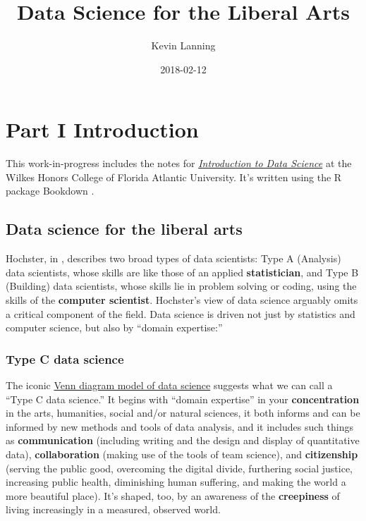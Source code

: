 \documentclass[]{book}
\title{Data Science for the Liberal Arts}
\author{Kevin Lanning}
\date{2018-02-12}
\theoremstyle{definition}
\theoremstyle{definition}
\theoremstyle{definition}
\theoremstyle{remark}
\begin{document}
\maketitle

{
\setcounter{tocdepth}{1}
\tableofcontents
}
\part{Part I Introduction}\label{part-part-i-introduction}

This work-in-progress includes the notes for
\href{https://kevinlanning.github.io/DataSciSpring2018/}{\emph{\emph{Introduction
to Data Science}}} at the Wilkes Honors College of Florida Atlantic
University. It's written using the R package Bookdown
\citep{R-bookdown}.

\chapter{Data science for the liberal
arts}\label{data-science-for-the-liberal-arts}

Hochster, in \citet{hicks2017guide}, describes two broad types of data
scientists: Type A (Analysis) data scientists, whose skills are like
those of an applied \textbf{statistician}, and Type B (Building) data
scientists, whose skills lie in problem solving or coding, using the
skills of the \textbf{computer scientist}. Hochster's view of data
science arguably omits a critical component of the field. Data science
is driven not just by statistics and computer science, but also by
``domain expertise:''

\section{Type C data science}\label{type-c-data-science}

The iconic
\href{https://www.google.com/search?q=venn+diagram+model+of+data+science\&newwindow=1\&safe=active\&rlz=1C1CHBF_enUS762US763\&tbm=isch\&tbo=u\&source=univ\&sa=X\&ved=0ahUKEwiM_abBtY7XAhXDQCYKHdgyB58QsAQIOg\&biw=1378}{Venn
diagram model of data science} suggests what we can call a ``Type C data
science.'' It begins with ``domain expertise'' in your
\textbf{concentration} in the arts, humanities, social and/or natural
sciences, it both informs and can be informed by new methods and tools
of data analysis, and it includes such things as \textbf{communication}
(including writing and the design and display of quantitative data),
\textbf{collaboration} (making use of the tools of team science), and
\textbf{citizenship} (serving the public good, overcoming the digital
divide, furthering social justice, increasing public health, diminishing
human suffering, and making the world a more beautiful place). It's
shaped, too, by an awareness of the \textbf{creepiness} of living
increasingly in a measured, observed world.
\end{document}
